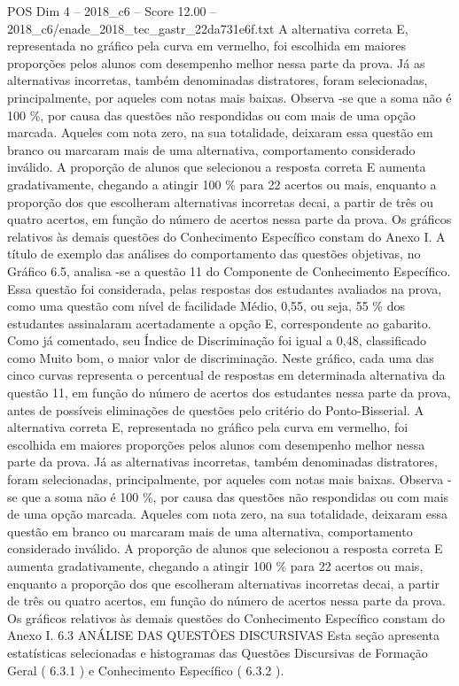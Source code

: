 \begin{textsample}{POS Dim 4 – 2018\_c6 – Score 12.00 – 2018\_c6/enade\_2018\_tec\_gastr\_22da731e6f.txt}
A alternativa correta E, representada no gráfico pela curva em vermelho, foi escolhida em maiores proporções pelos alunos com desempenho melhor nessa parte da prova.
Já as alternativas incorretas, também denominadas distratores, foram selecionadas, principalmente, por aqueles com notas mais baixas.
Observa -se que a soma não é 100 \%, por causa das questões não respondidas ou com mais de uma opção marcada.
Aqueles com nota zero, na sua totalidade, deixaram essa questão em branco ou marcaram mais de uma alternativa, comportamento considerado inválido.
A proporção de alunos que selecionou a resposta correta E aumenta gradativamente, chegando a atingir 100 \% para 22 acertos ou mais, enquanto a proporção dos que escolheram alternativas incorretas decai, a partir de três ou quatro acertos, em função do número de acertos nessa parte da prova.
Os gráficos relativos às demais questões do Conhecimento Específico constam do Anexo I.
A título de exemplo das análises do comportamento das questões objetivas, no Gráfico 6.5, analisa -se a questão 11 do Componente de Conhecimento Específico.
Essa questão foi considerada, pelas respostas dos estudantes avaliados na prova, como uma questão com nível de facilidade Médio, 0,55, ou seja, 55 \% dos estudantes assinalaram acertadamente a opção E, correspondente ao gabarito.
Como já comentado, seu Índice de Discriminação foi igual a 0,48, classificado como Muito bom, o maior valor de discriminação.
Neste gráfico, cada uma das cinco curvas representa o percentual de respostas em determinada alternativa da questão 11, em função do número de acertos dos estudantes nessa parte da prova, antes de possíveis eliminações de questões pelo critério do Ponto-Bisserial.
A alternativa correta E, representada no gráfico pela curva em vermelho, foi escolhida em maiores proporções pelos alunos com desempenho melhor nessa parte da prova.
Já as alternativas incorretas, também denominadas distratores, foram selecionadas, principalmente, por aqueles com notas mais baixas.
Observa -se que a soma não é 100 \%, por causa das questões não respondidas ou com mais de uma opção marcada.
Aqueles com nota zero, na sua totalidade, deixaram essa questão em branco ou marcaram mais de uma alternativa, comportamento considerado inválido.
A proporção de alunos que selecionou a resposta correta E aumenta gradativamente, chegando a atingir 100 \% para 22 acertos ou mais, enquanto a proporção dos que escolheram alternativas incorretas decai, a partir de três ou quatro acertos, em função do número de acertos nessa parte da prova.
Os gráficos relativos às demais questões do Conhecimento Específico constam do Anexo I. 6.3 ANÁLISE DAS QUESTÕES DISCURSIVAS Esta seção apresenta estatísticas selecionadas e histogramas das Questões Discursivas de Formação Geral ( 6.3.1 ) e Conhecimento Específico ( 6.3.2 ).

\end{textsample}
